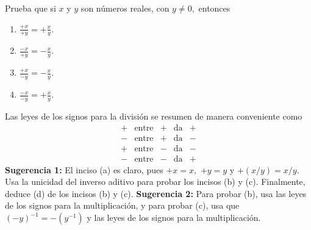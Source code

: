 \documentclass[12pt,a4paper]{article}
\begin{document}
        
    \thispagestyle{empty}
    

    \begin{problema}
        Prueba que si $x$
        y $y$ son números reales, con $y\neq0,$ entonces 
        \begin{enumerate}
            \item[(a)] $\frac{+x}{+y}=+\frac{x}{y}.$ \vspace{0.1cm}
            \item[(b)] $\frac{-x}{+y}=-\frac{x}{y}.$ \vspace{0.1cm}
            \item[(c)] $\frac{+x}{-y}=-\frac{x}{y}.$ \vspace{0.1cm}
            \item[(d)] $\frac{-x}{-y}=+\frac{x}{y}.$ 
        \end{enumerate}
        Las leyes de los signos para la división se resumen de manera conveniente
        como 
        \begin{equation*}
            \begin{array}{ccccc}
                + & \text{entre} & + & \text{da} & +\\
                - & \text{entre} & + & \text{da} & -\\
                + & \text{entre} & - & \text{da} & -\\
                - & \text{entre} & - & \text{da} & +
            \end{array}
        \end{equation*}
        \textbf{Sugerencia 1:} El inciso (a) es claro, pues $+x=x,$ $+y=y$
        y $+\left(x/y\right)=x/y.$ Usa la unicidad del inverso aditivo para
        probar los incisos (b) y (c). Finalmente, deduce (d) de los incisos
        (b) y (c). \textbf{Sugerencia 2:} Para probar (b), usa las leyes de
        los signos para la multiplicación, y para probar (c), usa que $\left(-y\right)^{-1}=-\left(y^{-1}\right)$
        y las leyes de los signos para la multiplicación.
    \end{problema}
\end{document}
